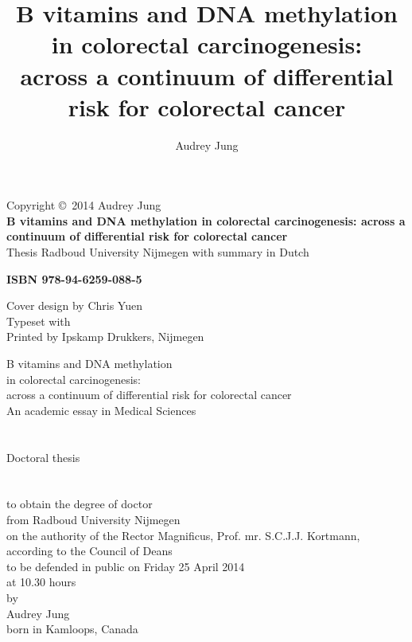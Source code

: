 \documentclass[10pt, letterpaper, twoside]{book} %
\title{{\bf B vitamins and DNA methylation \\ in colorectal carcinogenesis}: \\ \vspace{0.5ex} \Large across a continuum of differential risk for colorectal cancer}
\author{Audrey Jung}
\date{}
\begin{document}


  \maketitle

  
\newpage
  \thispagestyle{empty}
  \noindent Copyright \copyright\ 2014 Audrey Jung\\
  \textbf{B vitamins and DNA methylation in colorectal carcinogenesis: across a continuum of differential risk for colorectal cancer}\\
  \noindent Thesis Radboud University Nijmegen with summary in Dutch

  \noindent \textbf{ISBN 978-94-6259-088-5}

  \noindent Cover design by Chris Yuen\\
  \noindent Typeset with \LaTeXe\\
  \noindent Printed by Ipskamp Drukkers, Nijmegen\\


\newpage
\thispagestyle{empty}
\begin{center}
  {\Large B vitamins and DNA methylation\\ in colorectal carcinogenesis: \\ [0.3cm] \large across a continuum of differential risk for colorectal cancer}\\
  \bigskip
  \bigskip
  \bigskip
  \bigskip
  An academic essay in Medical Sciences\\
\quad\\
\quad\\
  {\large Doctoral thesis}\\
\quad\\
\quad\\
  to obtain the degree of doctor\\
  \smallskip
  from Radboud University Nijmegen\\
  \smallskip
  on the authority of the Rector Magnificus, Prof. mr. S.C.J.J. Kortmann,\\
  \smallskip
  according to the Council of Deans\\
  \smallskip
  to be defended in public on Friday 25 April 2014\\
  \smallskip
  at 10.30 hours\\
  \smallskip
  by\\
  \bigskip
  {\large Audrey Jung}\\
  \bigskip
  born in Kamloops, Canada\\
  \smallskip
\end{center}
\end{document}
